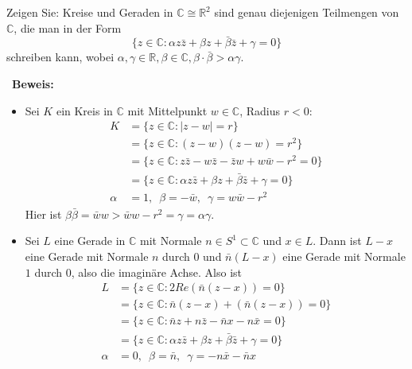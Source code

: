 \begin{assignment}
Zeigen Sie: Kreise und Geraden in $\mathbb{C} \cong \mathbb{R}^2$ sind genau diejenigen Teilmengen von $\mathbb{C}$, die man in der Form
  \begin{equation*}
    \{ z \in \mathbb{C} : \alpha z \bar{z}+ \beta z + \bar{\beta} \bar{z} + \gamma = 0 \} 
  \end{equation*}
  schreiben kann, wobei \( \alpha, \gamma \in \mathbb{R}, \beta \in \mathbb{C}, \beta \cdot \bar{ \beta} > \alpha \gamma \).
\end{assignment}
\begin{solution}
\
   \textbf{Beweis:}
  \begin{itemize}
    \item Sei \( K \) ein Kreis in \( \mathbb{C} \) mit Mittelpunkt \( w \in \mathbb{C} \), Radius \( r < 0 \):
    \begin{align*}  
      K &= \{ z \in \mathbb{C} : \vert z - w \vert = r \} \\
      &= \{ z \in \mathbb{C} : (z - w)(z-w) = r^2\} \\
      &= \{ z \in \mathbb{C} : z \bar{z} - w \bar{z} - \bar{z} w + w \bar{w} - r^2 = 0 \} \\
      &= \{ z \in \mathbb{C} : \alpha z \bar{z} + \beta z + \bar{\beta} \bar{z} + \gamma = 0 \} \\
      \alpha &= 1, \enspace \beta = - \bar{w}, \enspace \gamma = w \bar{w} - r^2
    \end{align*}
    Hier ist \( \beta \bar{\beta} = \bar{w}w > \bar{w} w - r^2 = \gamma = \alpha \gamma \).
    \item Sei \( L \) eine Gerade in \( \mathbb{C} \) mit Normale \( n \in S^1 \subset \mathbb{C} \) und \( x \in L \). Dann ist \( L - x \) eine Gerade mit Normale \( n \) durch \( 0 \) und \( \bar{n}(L -x) \) eine Gerade mit Normale \( 1 \) durch \( 0 \), also die imaginäre Achse.
    Also ist 
    \begin{align*}
      L &= \{ z \in \mathbb{C}: 2 Re(\bar{n}(z - x)) = 0 \} \\
      &= \{ z \in \mathbb{C}: \bar{n}(z-x) + (\bar{n}(z - x)) = 0 \} \\
      &= \{ z \in \mathbb{C}: \bar{n}z + n \bar{z} - \bar{n}x - n \bar{x}= 0 \} \\
      &= \{ z \in \mathbb{C}: \alpha z \bar{z} + \beta z + \bar{\beta} \bar{z} + \gamma = 0 \} \\
      \alpha &= 0, \enspace \beta = \bar{n}, \enspace \gamma = -n \bar{x} - \bar{n} x \\

\end{align*}
\end{itemize}
\end{solution}
